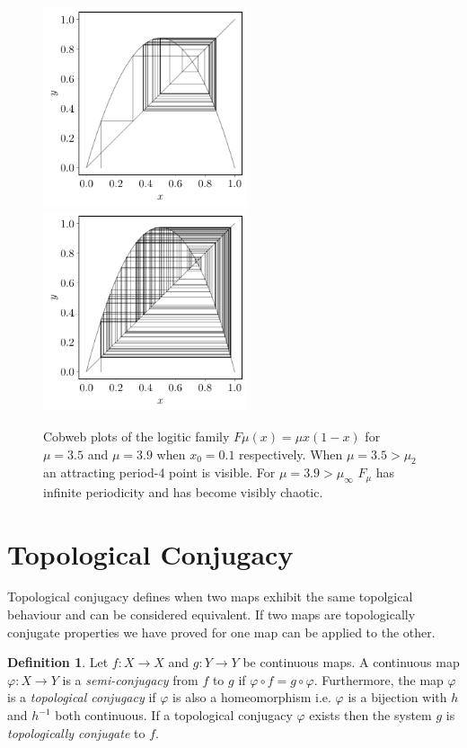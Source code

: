 \documentclass[11pt,a4paper,oneside]{memoir}
\theoremstyle{plain}
\theoremstyle{definition}
\newtheorem{defn}[thm]{Definition}
\begin{document}
\begin{figure}[h]
    \centering
    \includegraphics[width=6cm]{cobweb_0.1_3.5.pdf}
    \includegraphics[width=6cm]{cobweb_0.1_3.9.pdf}
    \caption{Cobweb plots of the logitic family $F\mu(x) = \mu x(1-x)$ for $\mu = 3.5$ and $\mu = 3.9$ when $x_0 = 0.1$ respectively. When $\mu = 3.5 > \mu_2$ an attracting period-4 point is visible. For $\mu = 3.9 > \mu_\infty$ $F_\mu$ has infinite periodicity and has become visibly chaotic.}
    \label{fig:cobweb_3.5_3.9}
\end{figure}

\section{Topological Conjugacy}
Topological conjugacy defines when two maps exhibit the same topolgical behaviour and can be considered equivalent. If two maps are topologically conjugate properties we have proved for one map can be applied to the other.

\begin{defn}
    Let $f: X \to X$ and $g: Y \to Y$ be continuous maps. A continuous map $\varphi: X \to Y$ is a \emph{semi-conjugacy} from $f$ to $g$ if $\varphi \circ f = g \circ \varphi$. Furthermore, the map $\varphi$ is a \emph{topological conjugacy} if $\varphi$ is also a homeomorphism i.e. $\varphi$ is a bijection with $h$ and $h^{-1}$ both continuous. If a topological conjugacy $\varphi$ exists then the system $g$ is \emph{topologically conjugate} to $f$.
\end{defn}
\end{document}

